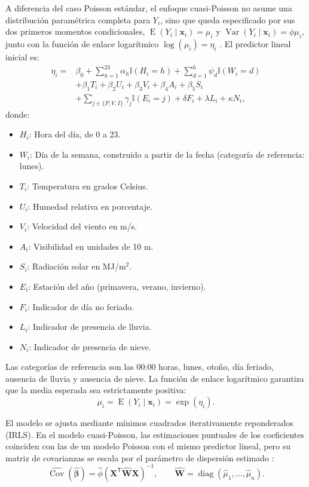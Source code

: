 \documentclass[12pt, a4paper]{article}
\numberwithin{equation}{section}
\begin{document}
A diferencia del caso Poisson estándar, el enfoque cuasi-Poisson no asume una distribución paramétrica completa para $Y_i$, sino que queda especificado por sus dos primeros momentos condicionales, $\operatorname{E}(Y_i\mid\mathbf{x}_i)=\mu_i$ y $\operatorname{Var}(Y_i\mid\mathbf{x}_i)=\phi\mu_i$, junto con la función de enlace logarítmico $\log(\mu_i)=\eta_i$ \cite{mccullagh,dunn}.
El predictor lineal inicial es:
\begin{align*}
\eta_i={}&\beta_0+\sum_{h=1}^{23}\alpha_h\mathbb{I}(H_i=h)
+\sum_{d=1}^{6}\psi_d\mathbb{I}(W_i=d)
\\
&+\beta_1 T_i+\beta_2 U_i+\beta_3 V_i+\beta_4 A_i+\beta_5 S_i\\
&+\sum_{j\in\{P,V,I\}}\gamma_j\mathbb{I}(E_i=j)
+\delta F_i+\lambda L_i+\kappa N_i,
\end{align*}
donde:
\begin{itemize}
    \item $H_i$: Hora del día, de 0 a 23.
    \item $W_i$: Día de la semana, construido a partir de la fecha (categoría de referencia: lunes).
    \item $T_i$: Temperatura en grados Celsius.
    \item $U_i$: Humedad relativa en porcentaje.
    \item $V_i$: Velocidad del viento en m/s.
    \item $A_i$: Visibilidad en unidades de 10 m.
    \item $S_i$: Radiación solar en MJ/m$^2$.
    \item $E_i$: Estación del año (primavera, verano, invierno).
    \item $F_i$: Indicador de día no feriado.
    \item $L_i$: Indicador de presencia de lluvia.
    \item $N_i$: Indicador de presencia de nieve.
\end{itemize}

Las categorías de referencia son las 00:00 horas, lunes, otoño, día feriado, ausencia de lluvia y ausencia de nieve. La función de enlace logarítmico garantiza que la media esperada sea estrictamente positiva:
\[
\mu_i=\operatorname{E}(Y_i\mid\mathbf{x}_i)=\exp\left(\eta_i\right).
\]

El modelo se ajusta mediante mínimos cuadrados iterativamente reponderados (IRLS). En el modelo cuasi-Poisson, las estimaciones puntuales de los coeficientes coinciden con las de un modelo Poisson con el mismo predictor lineal, pero su matriz de covarianzas se escala por el parámetro de dispersión estimado \cite{mccullagh}:
\[
\widehat{\operatorname{Cov}}(\widehat{\boldsymbol\beta})
=\widehat\phi(\mathbf{X}^{\mathsf T}\widehat{\mathbf{W}}\mathbf{X})^{-1},
\qquad \widehat{\mathbf W}=\operatorname{diag}(\widehat\mu_1,\ldots,\widehat\mu_n).
\]
\end{document}
